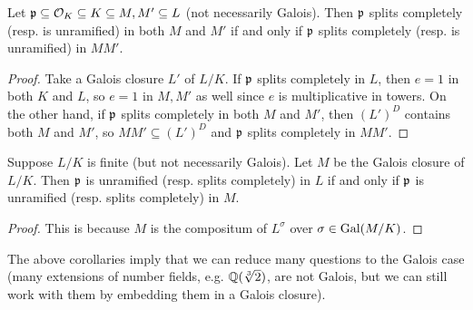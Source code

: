 \begin{corollary}
  Let $\mathfrak{p} \subseteq \mathcal{O}_K \subseteq K \subseteq M, M' \subseteq L$ (not necessarily Galois).
  Then $\mathfrak{p}$ splits completely (resp. is unramified)
  in both $M$ and $M'$ if and only if
  $\mathfrak{p}$ splits completely (resp. is unramified) in $M M'$.
\end{corollary}

\begin{proof}
  Take a Galois closure $L'$ of $L / K$. If
  $\mathfrak{p}$ splits completely in $L$, then $e = 1$ in
  both $K$ and $L$, so $e = 1$ in $M, M'$ as well since
  $e$ is multiplicative in towers.
  On the other hand, if $\mathfrak{p}$ splits completely
  in both $M$ and $M'$, then $(L')^{D}$ contains
  both $M$ and $M'$, so $M M' \subseteq (L')^{D}$
  and $\mathfrak{p}$ splits completely in $M M'$.
\end{proof}

\begin{corollary}
  Suppose $L / K$ is finite (but not necessarily Galois).
  Let $M$ be the Galois closure of $L / K$.
  Then $\mathfrak{p}$ is unramified (resp. splits completely)
  in $L$ if and only if $\mathfrak{p}$ is unramified (resp. splits
  completely) in $M$.
\end{corollary}

\begin{proof}
  This is because $M$ is the compositum of $L^\sigma$
  over $\sigma \in \operatorname{Gal}(M / K)$.
\end{proof}

\begin{remark}
  The above corollaries imply that we can reduce
  many questions to the Galois case (many extensions
  of number fields, e.g. $\mathbb{Q}(\sqrt[3]{2})$, are not
  Galois, but we can still work with them by embedding
  them in a Galois closure).
\end{remark}


